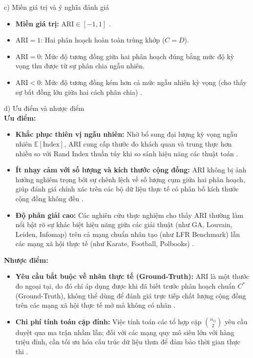 \documentclass[14pt,a4paper]{extarticle}
\begin{document}
\noindent c) Miền giá trị và ý nghĩa đánh giá
\begin{itemize}
    \item \textbf{Miền giá trị:} $\text{ARI} \in [-1, 1]$ \cite{Beldi2025, Dao2020}.
    \item $\text{ARI} = 1$: Hai phân hoạch hoàn toàn trùng khớp ($C = D$).
    \item $\text{ARI} = 0$: Mức độ tương đồng giữa hai phân hoạch đúng bằng mức độ kỳ vọng thu được từ sự phân chia ngẫu nhiên.
    \item $\text{ARI} < 0$: Mức độ tương đồng kém hơn cả mức ngẫu nhiên kỳ vọng (cho thấy sự bất đồng lớn giữa hai cách phân chia) \cite{Traag2014}.
\end{itemize}

\noindent d) Ưu điểm và nhược điểm
\\
\textbf{Ưu điểm:}
\begin{itemize}
    \item \textbf{Khắc phục thiên vị ngẫu nhiên:} Nhờ bổ sung đại lượng kỳ vọng ngẫu nhiên $\mathbb{E}[\text{Index}]$, ARI cung cấp thước đo khách quan và trung thực hơn nhiều so với Rand Index thuần túy khi so sánh hiệu năng các thuật toán \cite{Dao2020}.
    \item \textbf{Ít nhạy cảm với số lượng và kích thước cộng đồng:} ARI không bị ảnh hưởng nghiêm trọng bởi sự chênh lệch về số lượng cụm giữa hai phân hoạch, giúp đánh giá chính xác trên các bộ dữ liệu thực tế có phân bố kích thước cộng đồng không đều \cite{Dao2020}.
    \item \textbf{Độ phân giải cao:} Các nghiên cứu thực nghiệm cho thấy ARI thường làm nổi bật rõ sự khác biệt hiệu năng giữa các giải thuật (như GA, Louvain, Leiden, Infomap) trên cả mạng chuẩn nhân tạo (như LFR Benchmark) lẫn các mạng xã hội thực tế (như Karate, Football, Polbooks) \cite{Zhou2021}.
\end{itemize}

\indent \textbf{Nhược điểm:}
\begin{itemize}
    \item \textbf{Yêu cầu bắt buộc về nhãn thực tế (Ground-Truth):} ARI là một thước đo ngoại tại, do đó chỉ áp dụng được khi đã biết trước phân hoạch chuẩn $C^*$ (Ground-Truth), không thể dùng để đánh giá trực tiếp chất lượng cộng đồng trên các mạng xã hội thực tế mở mà không có nhãn \cite{Dao2020}.
    \item \textbf{Chi phí tính toán cặp đỉnh:} Việc tính toán các tổ hợp cặp $\binom{n_{ij}}{2}$ yêu cầu duyệt qua ma trận nhầm lẫn; đối với các mạng quy mô siêu lớn với hàng triệu đỉnh, cần tối ưu hóa cấu trúc dữ liệu thưa để đảm bảo thời gian thực thi \cite{Dao2020}.
\end{itemize}
\end{document}
